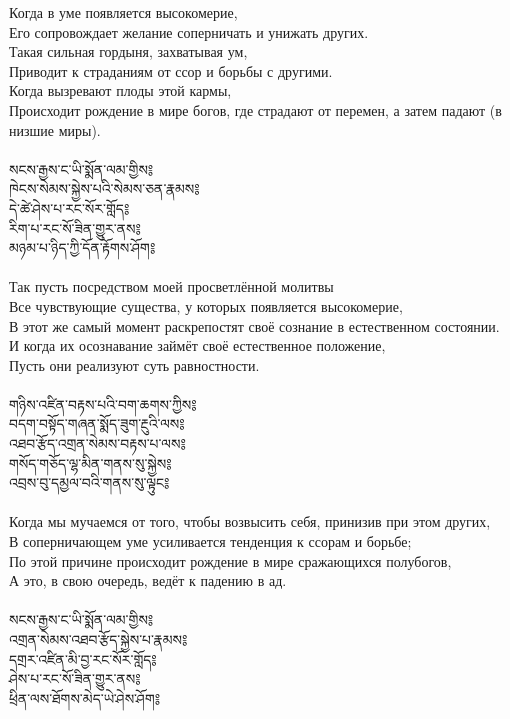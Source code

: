 Когда в уме появляется высокомерие,\\
Его сопровождает желание соперничать и унижать других.\\
Такая сильная гордыня, захватывая ум,\\
Приводит к страданиям от ссор и борьбы с другими.\\
Когда вызревают плоды этой кармы,\\
Происходит рождение в мире богов, где страдают от перемен, а затем падают (в низшие миры).\\
\\
{\ti
སངས་རྒྱས་ང་ཡི་སྨོན་ལམ་གྱིས༔ \\
ཁེངས་སེམས་སྐྱེས་པའི་སེམས་ཅན་རྣམས༔ \\
དེ་ཚེ་ཤེས་པ་རང་སོར་གློད༔ \\
རིག་པ་རང་སོ་ཟིན་གྱུར་ནས༔ \\
མཉམ་པ་ཉིད་ཀྱི་དོན་རྟོགས་ཤོག༔}\\
\\
Так пусть посредством моей просветлённой молитвы \\
Все чувствующие существа, у которых появляется высокомерие, \\
В этот же самый момент раскрепостят своё сознание в естественном состоянии. \\
И когда их осознавание займёт своё естественное положение, \\
Пусть они реализуют суть равностности.\\
\\
\newpage
{\ti
གཉིས་འཛིན་བརྟས་པའི་བག་ཆགས་ཀྱིས༔ \\
བདག་བསྟོད་གཞན་སྨོད་ཟུག་རྔུའི་ལས༔ \\
འཐབ་རྩོད་འགྲན་སེམས་བརྟས་པ་ལས༔ \\
གསོད་གཅོད་ལྷ་མིན་གནས་སུ་སྐྱེས༔ \\
འབྲས་བུ་དམྱལ་བའི་གནས་སུ་ལྟུང༔}\\
\\
Когда мы мучаемся от того, чтобы возвысить себя, принизив при этом других, \\
В соперничающем уме усиливается тенденция к ссорам и борьбе; \\
По этой причине происходит рождение в мире сражающихся полубогов, \\
А это, в свою очередь, ведёт к падению в ад.\\
\\
{\ti
སངས་རྒྱས་ང་ཡི་སྨོན་ལམ་གྱིས༔ \\
འགྲན་སེམས་འཐབ་རྩོད་སྐྱེས་པ་རྣམས༔ \\
དགྲར་འཛིན་མི་བྱ་རང་སོར་གློད༔ \\
ཤེས་པ་རང་སོ་ཟིན་གྱུར་ནས༔ \\
ཕྲིན་ལས་ཐོགས་མེད་ཡེ་ཤེས་ཤོག༔}\\
\\

